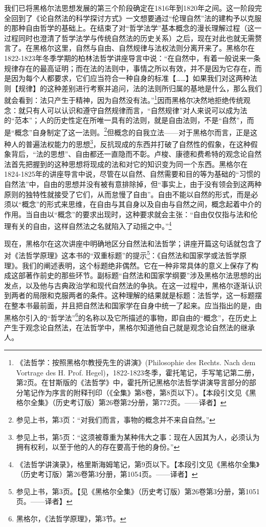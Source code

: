 我们已将黑格尔法思想发展的第三个阶段确定在1816年到1820年之间。这一阶段完全回到了《论自然法的科学探讨方式》一文想要通过“伦理自然”法的建构予以克服的那种自由哲学的基础上。在结束了对“哲学法学”基本概念的漫长理解过程（这一过程同时也澄清了哲学法学与传统自然法的历史关系）之后，现在对此也就无需赘言了。在黑格尔这里，自然与自由、自然规律与法权法则分离开来了。黑格尔在1822-1823年冬季学期的柏林法哲学讲座导言中说：“在自然中，有着一般说来一条规律存在的最高证明；而在法的法则中，事情之所以有效，并不是因为它存在，而是因为每个人都要求，它们应当符合一种自身的标准【……】如果我们对这两种法则【规律】的这种差别进行考察并追问，法的法则所归属的基地是什么，那么我们就会看到：法只产生于精神，因为自然没有法。”\footnote{《法哲学：按照黑格尔教授先生的讲演》(Philosophie des Rechts. Nach dem Vortrage des H. Prof. Hegel)，1822-1823冬季，霍托笔记，手写笔记第二册，第2页。在甘斯版的《法哲学》中，霍托所记黑格尔法哲学讲演导言部分的部分笔记作为序言的附释刊印（《全集》第8卷，第8页以下）。【本段引文见《黑格尔全集》（历史考订版）第26卷第2分册，第772页。——译者】}因而黑格尔决然地拒绝传统观念：就只有人可以认识和遵守自然规律而言，“自然规律”对人来说可以成为法的“范本”；人的历史性定在所唯一具有的法则，就是自由法则，不是“自然”，而是“概念”自身制定了这一法则。\footnote{参见上书，第3页：“对我们而言，事物的概念并不来自自然。”}但概念的自我立法——对于黑格尔而言，正是这种人的普遍法权能力的思想\footnote{参见上书，第5页：“这须被尊重为某种伟大之事：现在人因其为人，必须认为拥有权利，以至于他的人的存在要高于他的身份。”}，反抗现成的东西并打破了自然性的假象，在这种假象背后，“法的思想”、自由都还一直隐而不彰。卢梭、康德和费希特的观念论自然法首先把握到的这种思想将现成的法和对它的知识变为同一个东西。黑格尔在1824-1825年的讲座导言中说，尽管在以自然、自然需要和目的等为基础的“习惯的自然法”中，自由的思想并没有被有意排除掉，但“事实上，由于没有领会到这两种原则的独特性就接受了它们，从而怠慢了自由”。自由不能以自然的形式，而是必须以“概念”的形式来思维，在自由与其自身以及自由与自然之间，概念起着中介的作用。当自由以“概念”的要求出现时，这种要求就会主张：“自由仅仅指与法和伦理有关的自由，这样自然法之名就陷入了动摇之中。”\footnote{《法哲学讲演录》，格里斯海姆笔记，第9页以下。【本段引文见《黑格尔全集》（历史考订版）第26卷第3分册，第1054页。——译者】}

现在，黑格尔在这次讲座中明确地区分自然法和法哲学；讲座开篇这句话就包含了对《法哲学原理》这本书的“双重标题”的提示\footnote{参见上书，第3页。【见《黑格尔全集》（历史考订版）第26卷第3分册，第1051页。——译者】}：《自然法和国家学或法哲学原理》。我们的阐述表明，这个标题绝非偶然。它在一种非常具体的意义上保存了构成这部著作前史的那些环节。副标题“自然法和国家学纲要”涉及黑格尔法思想的出发点，以及他与古典政治学和现代自然法的争执。在这一过程中，黑格尔逐渐认识到两者的局限和克服两者的条件。这种理解的结果就是标题：法哲学，这一标题摆在整本书最前面，并且把自然法和国家学在自身中统一了起来。应当指出的是，由黑格尔引入的“哲学法”\footnote{黑格尔，《法哲学原理》，第3节。}的名称以及它所描述的事物，即自由的“概念”，在历史上产生于观念论自然法，在法哲学中，黑格尔知道他自己就是观念论自然法的继承人。